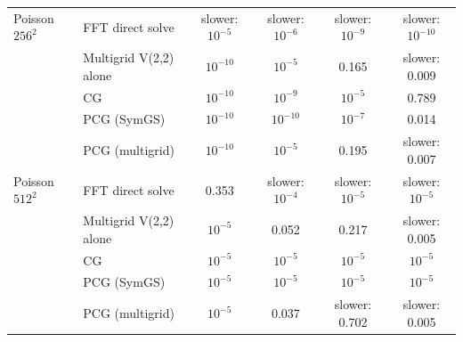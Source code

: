 {\begin{tabular}{llcccc}
\midrule
Poisson $256^2$ & FFT direct solve & slower: $10^{-5}$ & slower: $10^{-6}$ & slower: $10^{-9}$ & slower: $10^{-10}$ \\
 & Multigrid V(2,2) alone & $10^{-10}$ & $10^{-5}$ & 0.165 & slower: 0.009 \\
 & CG & $10^{-10}$ & $10^{-9}$ & $10^{-5}$ & 0.789 \\
 & PCG (SymGS) & $10^{-10}$ & $10^{-10}$ & $10^{-7}$ & 0.014 \\
 & PCG (multigrid) & $10^{-10}$ & $10^{-5}$ & 0.195 & slower: 0.007 \\
\midrule
Poisson $512^2$ & FFT direct solve & 0.353 & slower: $10^{-4}$ & slower: $10^{-5}$ & slower: $10^{-5}$ \\
 & Multigrid V(2,2) alone & $10^{-5}$ & 0.052 & 0.217 & slower: 0.005 \\
 & CG & $10^{-5}$ & $10^{-5}$ & $10^{-5}$ & $10^{-5}$ \\
 & PCG (SymGS) & $10^{-5}$ & $10^{-5}$ & $10^{-5}$ & $10^{-5}$ \\
 & PCG (multigrid) & $10^{-5}$ & 0.037 & slower: 0.702 & slower: 0.005 \\
\bottomrule
\end{tabular}}
\newcommand{\caVsMgMin}{3.62$\times$}
\newcommand{\caVsMgMax}{3.71$\times$}
\newcommand{\caVsKrylovMin}{3.85$\times$}
\newcommand{\caVsKrylovMax}{5.31$\times$}
\newcommand{\caFftRatioMin}{2.87$\times$}
\newcommand{\caFftRatioMax}{2.91$\times$}
\newcommand{\caVsMgEnsMin}{1.93$\times$}
\newcommand{\caVsMgEnsMax}{2.03$\times$}
\newcommand{\caEnsVsPairMin}{0.82$\times$}
\newcommand{\caEnsVsPairMax}{1.14$\times$}
\newcommand{\caEnsVsSolverMin}{380$\times$}
\newcommand{\caEnsVsSolverMax}{$>10^{3}\times$}
\newcommand{\caNumEns}{12}
